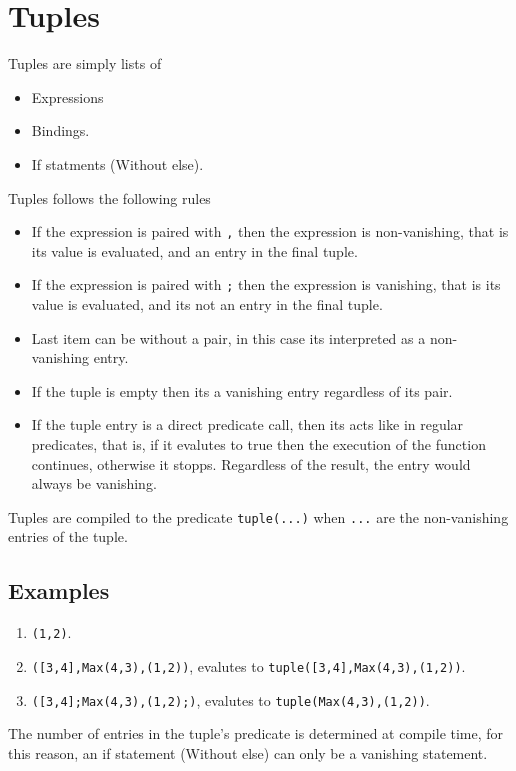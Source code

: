 \section{Tuples}

Tuples are simply lists of 
\begin{itemize}
    \item Expressions
    \item Bindings.
    \item If statments (Without else).
\end{itemize}

\noindent Tuples follows the following rules
\begin{itemize}
    \item If the expression is paired with \texttt{,} then the expression is 
        non-vanishing, that is its value is evaluated, and an entry in the final tuple.

    \item If the expression is paired with \texttt{;} then the expression is 
        vanishing, that is its value is evaluated, and its not an entry in the final tuple.

    \item Last item can be without a pair, in this case its interpreted as a non-vanishing entry. 

    \item If the tuple is empty then its a vanishing entry regardless of its pair.

    \item If the tuple entry is a direct predicate call, then its acts like in regular predicates, that is,
        if it evalutes to true then the execution of the function continues, otherwise it stopps. Regardless
        of the result, the entry would always be vanishing.
\end{itemize}

Tuples are compiled to the predicate \texttt{tuple(...)} when \texttt{...} are the non-vanishing
entries of the tuple.


\subsection{Examples}
\begin{enumerate}
    \item \texttt{(1,2)}.
    \item \texttt{([3,4],Max(4,3),(1,2))}, evalutes to \texttt{tuple([3,4],Max(4,3),(1,2))}.
    \item \texttt{([3,4];Max(4,3),(1,2);)}, evalutes to \texttt{tuple(Max(4,3),(1,2))}.
\end{enumerate}


\begin{note}
    The number of entries in the tuple's predicate is determined at compile time, for this reason,
    an if statement (Without else) can only be a vanishing statement.
\end{note}


